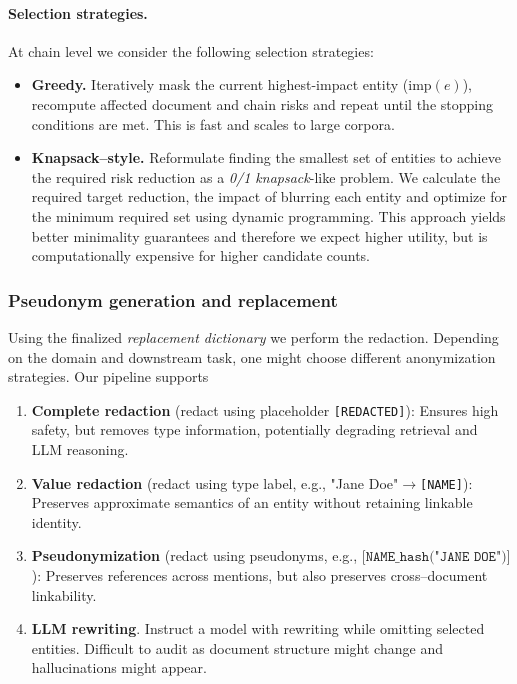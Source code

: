 \paragraph{Selection strategies.}
At chain level we consider the following selection strategies:
\begin{itemize}
  \item \textbf{Greedy.} Iteratively mask the current highest-impact entity ($\mathrm{imp}(e)$), recompute affected document and chain risks and repeat until the stopping conditions are met. This is fast and scales to large corpora.
  \item \textbf{Knapsack–style.} Reformulate finding the smallest set of entities to achieve the required risk reduction as a \textit{0/1 knapsack}-like problem. We calculate the required target reduction, the impact of blurring each entity and optimize for the minimum required set using dynamic programming. This approach yields better minimality guarantees and therefore we expect higher utility, but is computationally expensive for higher candidate counts.
\end{itemize}


\subsubsection{Pseudonym generation and replacement}
Using the finalized \textit{replacement dictionary} we perform the redaction. Depending on the domain and downstream task, one might choose different anonymization strategies. Our pipeline supports 
\begin{enumerate}
  \item \textbf{Complete redaction} (redact using placeholder \texttt{[REDACTED]}): Ensures high safety, but removes type information, potentially degrading retrieval and LLM reasoning.
  \item \textbf{Value redaction} (redact using type label, e.g., "Jane Doe"$\rightarrow$\texttt{[NAME]}): Preserves approximate semantics of an entity without retaining linkable identity.
  \item \textbf{Pseudonymization} (redact using pseudonyms, e.g., $\texttt{[NAME\_{hash}("JANE DOE")]}$): Preserves references across mentions, but also preserves cross–document linkability. 
  \item \textbf{LLM rewriting}. Instruct a model with rewriting while omitting selected entities. Difficult to audit as document structure might change and hallucinations might appear.  
\end{enumerate}


